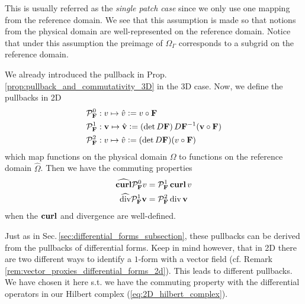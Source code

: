 \documentclass[../master_thesis.tex]{subfiles}
\begin{document}
This is usually referred as the \textit{single patch case} since we only use 
one mapping from the reference domain. We see that this assumption is made so that 
notions from the physical domain are well-represented on the reference 
domain. Notice that under this assumption the preimage of $\Omega_\Gamma$ corresponds to 
a subgrid on the reference domain. 

We already introduced the pullback in Prop.\,\ref{prop:pullback_and_commutativity_3D} in the 3D case. 
Now, we define the pullbacks in 2D
\begin{align*}
    &\mathcal{P}_\mathbf{F}^0: v \mapsto \hat{v} \vcentcolon= v \circ \mathbf{F}
    \\ &\mathcal{P}_\mathbf{F}^1: \mathbf{v} \mapsto \hat{\mathbf{v}} 
        \vcentcolon= (\det D\mathbf{F} )\,D\mathbf{F}^{-1} (\mathbf{v} \circ \mathbf{F})
    \\ &\mathcal{P}_\mathbf{F}^2: v \mapsto \hat{v} \vcentcolon= (\det D\mathbf{F}) (v\circ \mathbf{F})
\end{align*}
which map functions on the physical domain $\Omega$ to functions on the reference domain 
$\hat{\Omega}$. Then we have the commuting properties
\begin{align*}
    \widehat{\veccurl} \mathcal{P}_\mathbf{F}^0 v &= \mathcal{P}_\mathbf{F}^1 \veccurl v
    \\ \widehat{\diver} \mathcal{P}_\mathbf{F}^1 \mathbf{v} &= \mathcal{P}_\mathbf{F}^2 \diver \mathbf{v}
\end{align*}
when the $\veccurl$ and divergence are well-defined.
\begin{remark}
    Just as in Sec.\,\ref{sec:differential_forms_subsection}, 
    these pullbacks can be derived from the pullbacks of differential forms.
    Keep in mind however, that in 2D there are two different ways to identify a $1$-form 
    with a vector field (cf. Remark \ref{rem:vector_proxies_differential_forms_2d}). 
    This leads to different pullbacks. We have chosen it 
    here s.t. we have the commuting property with the differential operators in 
    our Hilbert complex (\ref{eq:2D_hilbert_complex}).
\end{remark}
\end{document}
